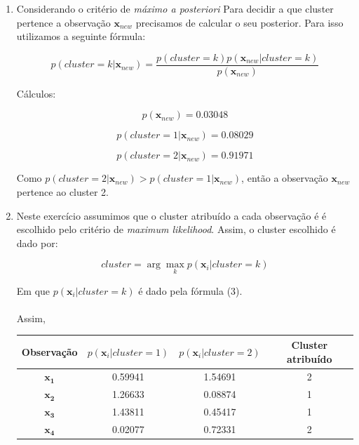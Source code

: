 \documentclass[a4paper,12pt]{article} %
\begin{document}
\begin{enumerate}
\item
Considerando o critério de \textit{máximo a posteriori} Para decidir a que 
cluster pertence a observação $\mathbf{x}_{new}$ precisamos de calcular o seu 
posterior. 
Para isso utilizamos a seguinte fórmula:

\begin{equation}
    p(cluster = k|\mathbf{x}_{new}) = \frac{p(cluster = k)p(\mathbf{x}_{new}|cluster = k)}{p(\mathbf{x}_{new})}
\end{equation}

Cálculos:

\begin{equation*}
    p(\mathbf{x}_{new}) = 0.03048
\end{equation*}

\begin{equation*}
    p(cluster = 1|\mathbf{x}_{new}) = 0.08029
\end{equation*}

\begin{equation*}
    p(cluster = 2|\mathbf{x}_{new}) = 0.91971
\end{equation*}

Como $p(cluster = 2|\mathbf{x}_{new}) > p(cluster = 1|\mathbf{x}_{new})$, 
então a observação $\mathbf{x}_{new}$ pertence ao cluster 2.

\item Neste exercício assumimos que o cluster atribuído a cada observação é 
é escolhido pelo critério de \textit{maximum likelihood}.
Assim, o cluster escolhido é dado por:

\begin{equation}
    cluster = \arg\max_k p(\mathbf{x}_i|cluster = k)
\end{equation}

Em que $p(\mathbf{x}_i|cluster = k)$ é dado pela fórmula (3). \\ \\

Assim,

\begin{table}[H]
\centering
\begin{tabular}{|c|c|c|c|}
\hline
Observação & $p(\mathbf{x}_i|cluster = 1)$ & $p(\mathbf{x}_i|cluster = 2)$ & Cluster atribuído\\ \hline
$\mathbf{x_1}$ &  0.59941  & 1.54691 & 2 \\ \hline
$\mathbf{x_2}$ &  1.26633  & 0.08874 & 1 \\ \hline
$\mathbf{x_3}$ &  1.43811  & 0.45417 & 1 \\ \hline
$\mathbf{x_4}$ &  0.02077  & 0.72331 & 2 \\ \hline
\end{tabular}
\end{table}


\end{enumerate}
\end{document}
